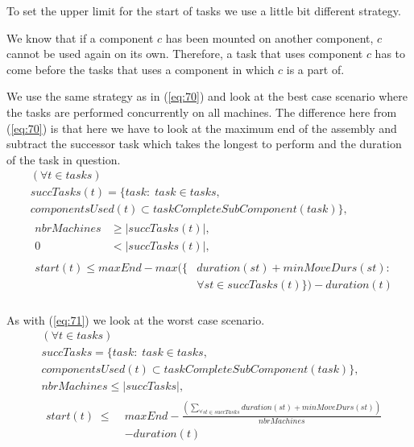    \noindent To set the upper limit for the start of tasks we use a little bit different strategy.
    
    We know that if a component $c$ has been mounted on another component, $c$ cannot be used again on its own. Therefore, a task that uses component $c$ has to come before the tasks that uses a component in which $c$ is a part of.
    
    We use the same strategy as in (\ref{eq:70}) and look at the best case scenario where the tasks are performed concurrently on all machines. The difference here from (\ref{eq:70}) is that here we have to look at the maximum end of the assembly and subtract the successor task which takes the longest to perform and the duration of the task in question.
  \begin{equation}\label{eq:72}
  \begin{aligned}
  &(\forall t \in tasks) \\
  &succTasks(t) = \{task : \; task \in tasks,\\
  &componentsUsed(t) \subset taskCompleteSubComponent(task)\}, \\
  &\begin{aligned}
  nbrMachines &\ge |succTasks(t)|,\\
  0 &< |succTasks(t)|,
  \end{aligned}\\
  &\begin{aligned}
  start(t) \le maxEnd - max(\{&duration(st) + minMoveDurs(st) :\\
  &\forall st \in succTasks(t)\}) - duration(t)
  \end{aligned}\\
  \end{aligned}
  \end{equation}

  \noindent  As with (\ref{eq:71}) we look at the worst case scenario.
  \begin{equation}\label{eq:73}
  \begin{aligned}
  &(\forall t \in tasks)\\
  &succTasks = \{task : \; task \in tasks, \\
  &componentsUsed(t) \subset taskCompleteSubComponent(task)\}, \\
  &nbrMachines \le |succTasks|, \\
  &\begin{aligned}
  start(t) \; \le \; &maxEnd - \frac{\left(\sum_{\forall st \in succTasks}duration(st) + minMoveDurs(st)\right)}{nbrMachines}\\
  &- duration(t)
  \end{aligned}
  \end{aligned}
  \end{equation}

